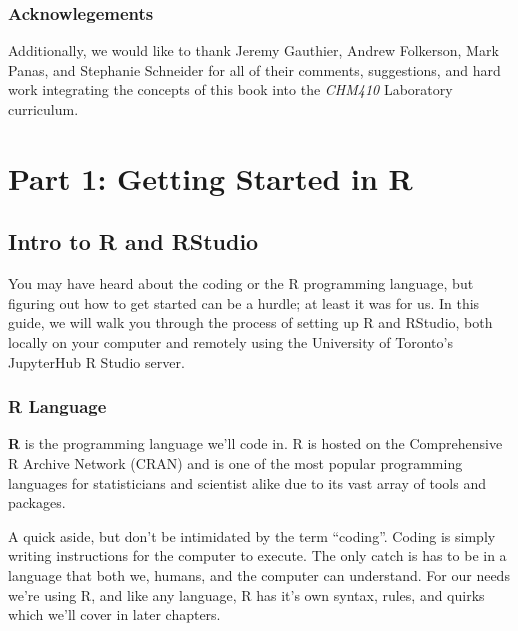 \documentclass[
]{book}
\begin{document}
\hypertarget{acknowlegements}{%
\section*{Acknowlegements}\label{acknowlegements}}

Additionally, we would like to thank Jeremy Gauthier, Andrew Folkerson, Mark Panas, and Stephanie Schneider for all of their comments, suggestions, and hard work integrating the concepts of this book into the \emph{CHM410} Laboratory curriculum.

\hypertarget{part-part-1-getting-started-in-r}{%
\part*{Part 1: Getting Started in R}\label{part-part-1-getting-started-in-r}}

\hypertarget{intro-to-r-and-rstudio}{%
\chapter{Intro to R and RStudio}\label{intro-to-r-and-rstudio}}

You may have heard about the coding or the R programming language, but figuring out how to get started can be a hurdle; at least it was for us. In this guide, we will walk you through the process of setting up R and RStudio, both locally on your computer and remotely using the University of Toronto's JupyterHub R Studio server.

\hypertarget{r-language}{%
\section{R Language}\label{r-language}}

\textbf{R} is the programming language we'll code in. R is hosted on the Comprehensive R Archive Network (CRAN) and is one of the most popular programming languages for statisticians and scientist alike due to its vast array of tools and packages.

A quick aside, but don't be intimidated by the term ``coding''. Coding is simply writing instructions for the computer to execute. The only catch is has to be in a language that both we, humans, and the computer can understand. For our needs we're using R, and like any language, R has it's own syntax, rules, and quirks which we'll cover in later chapters.
\end{document}
